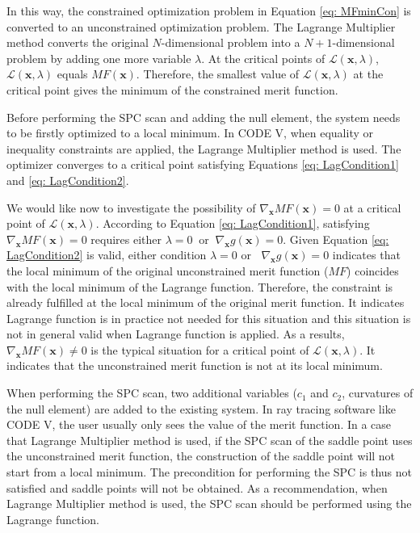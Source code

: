 In this way, the constrained optimization problem in Equation \ref{eq: MFminCon} is converted to an unconstrained optimization problem. The Lagrange Multiplier method converts the original $N$-dimensional problem into a $N+1$-dimensional problem by adding one more variable $\lambda$.  At the critical points of $\mathcal{L}(\textbf{x},\lambda)$, $\mathcal{L}(\textbf{x},\lambda)$ equals $MF(\textbf{x})$. Therefore, the smallest value of $\mathcal{L}(\textbf{x},\lambda)$ at the critical point gives the minimum of the constrained merit function. 

Before performing the SPC scan and adding the null element, the system needs to be firstly optimized to a local minimum. In CODE V, when equality or inequality constraints are applied, the Lagrange Multiplier method is used. The optimizer converges to a critical point satisfying Equations \ref{eq: LagCondition1} and \ref{eq: LagCondition2}. 

We would like now to investigate the possibility of $\nabla_\textbf{x}MF(\textbf{x}) = 0$ at a critical point of $\mathcal{L}(\textbf{x},\lambda)$. According to Equation \ref{eq: LagCondition1}, satisfying $\nabla_\textbf{x}MF(\textbf{x}) = 0$ requires either $\lambda =0 \;\; \text{or} \;\; \nabla_\textbf{x}g(\textbf{x})=0$. Given Equation \ref{eq: LagCondition2} is valid, either condition $\lambda = 0$ or $\;\; \nabla_\textbf{x}g(\textbf{x})=0$ indicates that the local minimum of the original unconstrained merit function ($MF$) coincides with the local minimum of the Lagrange function. Therefore, the constraint is already fulfilled at the local minimum of the original merit function. It indicates Lagrange function is in practice not needed for this situation and this situation is not in general valid when Lagrange function is applied. As a results, $\nabla_\textbf{x}MF(\textbf{x}) \ne 0$ is the typical situation for a critical point of $\mathcal{L}(\textbf{x},\lambda)$. It indicates that the unconstrained merit function is not at its local minimum.  

When performing the SPC scan, two additional variables ($c_1$ and $c_2$, curvatures of the null element) are added to the existing system. In ray tracing software like CODE V, the user usually only sees the value of the merit function. In a case that Lagrange Multiplier method is used, if the SPC scan of the saddle point uses the unconstrained merit function, the construction of the saddle point will not start from a local minimum. The precondition for performing the SPC is thus not satisfied and saddle points will not be obtained. As a recommendation, when Lagrange Multiplier method is used, the SPC scan should be performed using the Lagrange function.  

